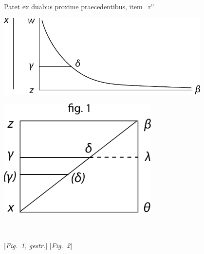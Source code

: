 Patet ex duabus proxime praecedentibus,
item
%
%
~r\textsuperscript{o}\rbrack\
%
\pend%
\newpage%
\pstart 
\begin{minipage}[t]{0.5\textwidth}
\includegraphics[width=0.80\textwidth]{gesamttex/edit_VIII,3/images/LH_35_09_23_001-002_d1.pdf}
\end{minipage}
\hspace{5mm}
\begin{minipage}[t]{0.5\textwidth}
\includegraphics[width=0.6\textwidth]{gesamttex/edit_VIII,3/images/LH_35_09_23_001-002_d2.pdf}
\end{minipage}
\\
\\
\hspace*{22mm} [\textit{Fig.~1, gestr.}]\hspace*{50mm} [\textit{Fig.~2}]\label{LH_35_09_23_001-002_Fig.2}
\pend
\vspace{1.5em}
\pstart
